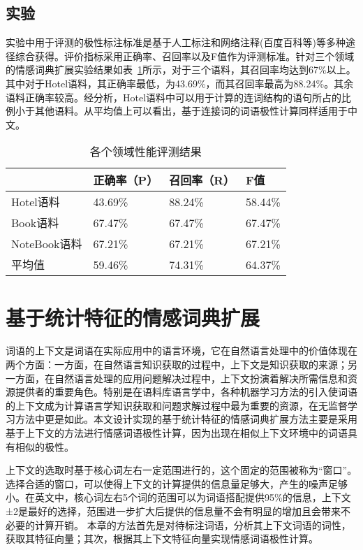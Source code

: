 \subsection{实验}
实验中用于评测的极性标注标准是基于人工标注和网络注释(百度百科等)等多种途径综合获得。评价指标采用正确率、召回率以及F值作为评测标准。针对三个领域的情感词典扩展实验结果如表~\ref{tab3-2}所示，对于三个语料，其召回率均达到67\%以上。其中对于Hotel语料，其正确率最低，为43.69\%，而其召回率最高为88.24\%。其余语料正确率较高。经分析，Hotel语料中可以用于计算的连词结构的语句所占的比例小于其他语料。从平均值上可以看出，基于连接词的词语极性计算同样适用于中文。
\begin{table}[htp]
\centering
\caption{各个领域性能评测结果}
\label{tab3-2}
\begin{tabular}{|l|l|l|l|}
\hline
 &正确率（P）& 召回率（R）& F值 \\
 \hline
 Hotel语料& 43.69\%& 88.24\%& 58.44\% \\
Book语料& 67.47\%& 67.47\%& 67.47\% \\
NoteBook语料&67.21\%& 67.21\%& 67.21\% \\
\hline
平均值&59.46\%&74.31\%&64.37\% \\
\hline
\end{tabular}
\end{table}

\section{基于统计特征的情感词典扩展}
词语的上下文是词语在实际应用中的语言环境，它在自然语言处理中的价值体现在两个方面：一方面，在自然语言知识获取的过程中，上下文是知识获取的来源；另一方面，在自然语言处理的应用问题解决过程中，上下文扮演着解决所需信息和资源提供者的重要角色。特别是在语料库语言学中，各种机器学习方法的引入使词语的上下文成为计算语言学知识获取和问题求解过程中最为重要的资源，在无监督学习方法中更是如此。本文设计实现的基于统计特征的情感词典扩展方法主要是采用基于上下文的方法进行情感词语极性计算，因为出现在相似上下文环境中的词语具有相似的极性。

上下文的选取时基于核心词左右一定范围进行的，这个固定的范围被称为“窗口”。选择合适的窗口，可以使得上下文的计算提供的信息量足够大，产生的噪声足够小。在英文中，核心词左右5个词的范围可以为词语搭配提供95\%的信息，上下文±2是最好的选择，范围进一步扩大后提供的信息量不会有明显的增加且会带来不必要的计算开销。
本章的方法首先是对待标注词语，分析其上下文词语的词性，获取其特征向量；其次，根据其上下文特征向量实现情感词语极性计算。

